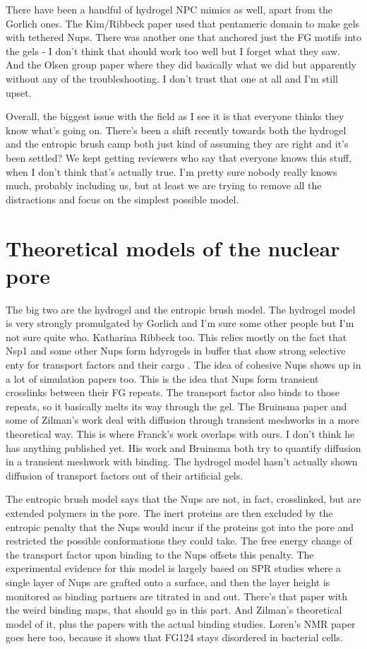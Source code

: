 {There have been a handful of hydrogel NPC mimics as well, apart from the Gorlich ones.  The Kim/Ribbeck paper used that pentameric domain to make gels with tethered Nups.  There was another one that anchored just the FG motifs into the gels - I don't think that should work too well but I forget what they saw.  And the Olsen group paper where they did basically what we did but apparently without any of the troubleshooting.  I don't trust that one at all and I'm still upset.

Overall, the biggest issue with the field as I see it is that everyone thinks they know what's going on.  There's been a shift recently towards both the hydrogel and the entropic brush camp both just kind of assuming they are right and it's been settled?  We kept getting reviewers who say that everyone knows this stuff, when I don't think that's actually true.  I'm pretty sure nobody really knows much, probably including us, but at least we are trying to remove all the distractions and focus on the simplest possible model.

\section{Theoretical models of the nuclear pore}

The big two are the hydrogel and the entropic brush model.  The hydrogel model is very strongly promulgated by Gorlich and I'm sure some other people but I'm not sure quite who.  Katharina Ribbeck too. This relies mostly on the fact that Nsp1 and some other Nups form hdyrogels in buffer that show strong selective enty for transport factors and their cargo \cite{frey06, frey07}.  The idea of cohesive Nups shows up in a lot of simulation papers too.  This is the idea that Nups form transient crosslinks between their FG repeats.  The transport factor also binds to those repeats, so it basically melts its way through the gel.  The Bruinsma paper and some of Zilman's work deal with diffusion through transient meshworks in a more theoretical way.  This is where Franck's work overlaps with ours.  I don't think he has anything published yet.  His work and Bruinsma both try to quantify diffusion in a transient meshwork with binding.  The hydrogel model hasn't actually shown diffusion of transport factors out of their artificial gels.

The entropic brush model says that the Nups are not, in fact, crosslinked, but are extended polymers in the pore.  The inert proteins are then excluded by the entropic penalty that the Nups would incur if the proteins got into the pore and restricted the possible conformations they could take.  The free energy change of the transport factor upon binding to the Nups offsets this penalty.  The experimental evidence for this model is largely based on SPR studies where a single layer of Nups are grafted onto a surface, and then the layer height is monitored as binding partners are titrated in and out.  There's that paper with the weird binding maps, that should go in this part.  And Zilman's theoretical model of it, plus the papers with the actual binding studies.  Loren's NMR paper goes here too, because it shows that FG124 stays disordered in bacterial cells.

}
